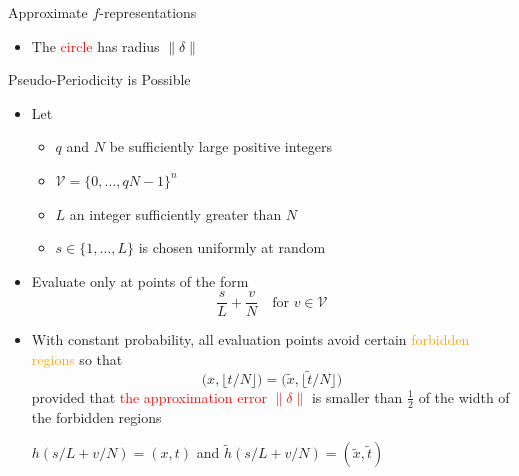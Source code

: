 \documentclass{beamer}
\renewcommand{\>}{\rangle}
\newcommand{\<}{\langle}
\begin{document}
\begin{frame}{Approximate $f$-representations}
\begin{center}
   \end{center}
   \begin{itemize}
   \item The \textcolor{red}{circle} has radius $\|\delta\|$
   
   \end{itemize}
\end{frame}


\begin{frame}{Pseudo-Periodicity is Possible}

\begin{itemize}
\item Let 
\begin{itemize}
\item $q$ and $N$ be sufficiently large positive integers

\item $\mathcal{V}=\{0,\ldots,qN-1\}^n$

\item $L$ an integer sufficiently greater than $N$

\item $s\in\{1,\ldots,L\}$ is chosen uniformly at random 
\end{itemize}

\medskip
\item Evaluate only at points of the form
\[
\frac{s}{L} + \frac{v}{N} \quad \mbox{for } v\in\mathcal{V}
\]

\item With constant probability, all evaluation points avoid certain \textcolor{orange}{forbidden regions} so that
\[
\big(x,\lfloor t / N\rfloor\big) = \big(\tilde{x},\lfloor \tilde{t} / N\rfloor\big)
\]
provided that \textcolor{red}{the approximation error $\|\delta\|$} is smaller than $\tfrac{1}{2}$ of the width of the forbidden regions

\medskip
$h(s/L+v/N)=(x,t)$ and $\tilde{h}(s/L+v/N)=(\tilde{x},\tilde{t})$
\end{itemize}

\end{frame}
\end{document}
